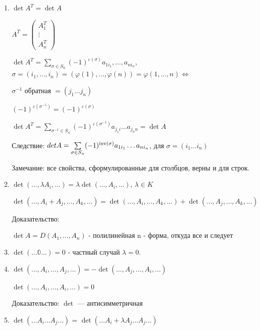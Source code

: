 \begin{enumerate}
    \item \(\det A^T = \det A\)

          \(A^T = \begin{pmatrix}
              A_1^T  \\
              \vdots \\
              A_n^T
          \end{pmatrix}\)

          \(\det A^T = \sum\limits_{\sigma \in S_n} (-1) ^{\varepsilon(\sigma)} a_{1 i_1}, \ldots, a_{n i_n}\), \(\sigma = (i_1, \ldots, i_n) = (\varphi(1), \ldots, \varphi(n)) = \varphi(1, \ldots, n) \Leftrightarrow \)
          
          \(\sigma^{-1}\) обратная \(= (j_1 \dots j_n)\)

          \((-1)^{\varepsilon(\sigma^{-1})} = (-1)^{\varepsilon(\sigma)}\)

          \(\det A^T = \sum\limits_{\sigma^{-1}\in S_n}(-1)^{\varepsilon(\sigma^{-1})}a_{j_1i} \dots a_{j_n n} = \det A\)

          Следствие: \(det A = \sum\limits_{\sigma \in S_n}(-1)^{\operatorname{inv} (\sigma)}a_{1i_1}\ldots a_{ni_n}\), для \(\sigma = (i_1\ldots i_n)\)

          Замечание: все свойства, сформулированные для столбцов, верны и для строк.

    \item \(\det(\ldots, \lambda A_i, \ldots) = \lambda \det(\ldots, A_i, \ldots)\), \(\lambda \in K\)

          \(\det(\ldots, A_i + A_j, \ldots, A_k, \ldots) = \det(\ldots, A_i, \ldots, A_k, \ldots) + \det(\ldots, A_j, \ldots, A_k, \ldots)\)

          Доказательство:

          \(\det A  = D(A_1,\ldots, A_n) \) - полилинейная n - форма, откуда все и следует

    \item \(\det ( \ldots\mathbb{0}\ldots) = 0 \) - частный случай $\lambda =0$.

    \item \(\det(\ldots, A_i, \ldots, A_j, \ldots) = -\det(\ldots, A_j, \ldots, A_i, \ldots)\)

          \(\det(\ldots, A_i, \ldots, A_i, \ldots) = 0\)

          Доказательство:
          \(\det\) --- антисимметричная

    \item \(\det (\ldots A_i\ldots A_j\ldots)\) = \(\det (\ldots A_i + \lambda A_j\ldots A_j\ldots)\)


\end{enumerate}
